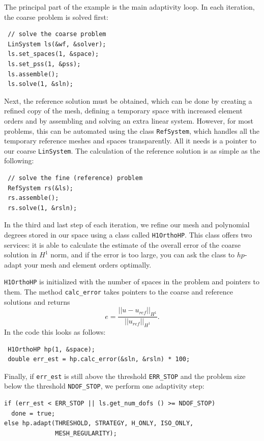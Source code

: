\documentclass[11pt]{article}
\begin{document}
The principal part of the example is the main adaptivity loop. In each iteration, the coarse problem
is solved first:
\begin{lstlisting}
 // solve the coarse problem
 LinSystem ls(&wf, &solver);
 ls.set_spaces(1, &space);
 ls.set_pss(1, &pss);
 ls.assemble();
 ls.solve(1, &sln);
\end{lstlisting}

Next, the reference solution must be obtained, which can be done by creating a refined copy of the mesh,
defining a temporary space with increased element orders and by assembling and solving an extra
linear system. However, for most problems, this can be automated using the class {\tt RefSystem}, which
handles all the temporary reference meshes and spaces transparently. All it needs is a pointer to our coarse
{\tt LinSystem}. The calculation of the reference solution is as simple as the following:
\begin{lstlisting}
 // solve the fine (reference) problem
 RefSystem rs(&ls);
 rs.assemble();
 rs.solve(1, &rsln);
\end{lstlisting}

In the third and last step of each iteration, we refine our mesh and polynomial degrees stored
in our space using a class called {\tt H1OrthoHP}. This class offers two services: it is able to
calculate  the estimate of the overall error of the coarse solution in $H^1$ norm, and if the
error is too large, you can ask the class to $hp$-adapt your mesh and element orders optimally.

{\tt H1OrthoHP} is initialized with the number of spaces in the problem and pointers to them.
The method \verb"calc_error" takes pointers to the coarse and reference solutions and returns
$$e = \frac{|| u - u_{ref} ||_{H^1}}{|| u_{ref} ||_{H^1}}.$$
In the code this looks as follows:
\begin{lstlisting}
 H1OrthoHP hp(1, &space);
 double err_est = hp.calc_error(&sln, &rsln) * 100;
\end{lstlisting}

Finally, if {\tt err\_est} is still above the threshold {\tt ERR\_STOP} and the problem size
below the threshold {\tt NDOF\_STOP}, we perform one adaptivity step:

\begin{lstlisting}
if (err_est < ERR_STOP || ls.get_num_dofs () >= NDOF_STOP)
  done = true;
else hp.adapt(THRESHOLD, STRATEGY, H_ONLY, ISO_ONLY,
              MESH_REGULARITY);
\end{lstlisting}
\end{document}
